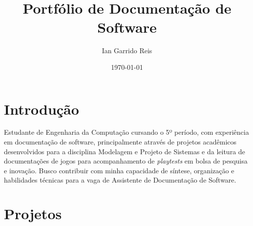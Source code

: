 \documentclass[12pt]{article}
\title{Portfólio de Documentação de Software}
\author{Ian Garrido Reis}
\date{\today}
\begin{document}
\maketitle

\section*{Introdução}
Estudante de Engenharia da Computação cursando o 5º período, com experiência em documentação de software, principalmente através de projetos acadêmicos desenvolvidos para a disciplina Modelagem e Projeto de Sistemas e da leitura de documentações de jogos para acompanhamento de \textit{playtests} em bolsa de pesquisa e inovação. Busco contribuir com minha capacidade de síntese, organização e habilidades técnicas para a vaga de Assistente de Documentação de Software.


\section*{Projetos}
\end{document}
